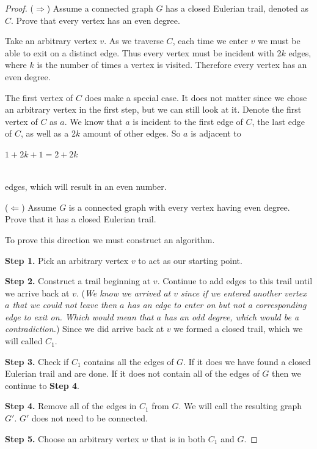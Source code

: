 \documentclass[10pt]{amsart}
\begin{document}
\begin{proof} 
    ($\Rightarrow$) Assume a connected graph $G$ has a closed Eulerian trail, denoted as $C$. Prove that
    every vertex has an even degree. 
    
    \noindent
    Take an arbitrary vertex $v$. As we traverse $C$, each time we enter $v$ we must be able to exit on a
    distinct edge. Thus every vertex must be incident with 2$k$ edges, where $k$ is the number of times
    a vertex is visited. Therefore every vertex has an even degree. 

    \noindent
    The first vertex of $C$ does make a special case. It does not matter since we chose an arbitrary
    vertex in the first step, but we can still look at it. Denote the first vertex of $C$ as $a$. We
    know that $a$ is incident to the first edge of $C$, the last edge of $C$, as well as a 2$k$ amount
    of other edges. So $a$ is adjacent to \\
    \centerline{$1+2k+1 = 2+2k$} \\
    edges, which will result in an even number.

    \noindent
    ($\Leftarrow$) Assume $G$ is a connected graph with every vertex having even degree. Prove that
    it has a closed Eulerian trail.

    \noindent
    To prove this direction we must construct an algorithm. 
    
    \noindent
    \textbf{Step 1.} Pick an arbitrary vertex $v$ to act as our starting point.

    \noindent
    \textbf{Step 2.} Construct a trail beginning at $v$. Continue to add edges to this trail until we
    arrive back at $v$. (\emph{We know we arrived at $v$ since if we entered another vertex $a$ that we
    could not leave then $a$ has an edge to enter on but not a corresponding edge to exit on. Which would
    mean that $a$ has an odd degree, which would be a contradiction.}) Since we did arrive back at
    $v$ we formed a closed trail, which we will called $C_1$.

    \noindent
    \textbf{Step 3.} Check if $C_1$ contains all the edges of $G$. If it does we have found a closed
    Eulerian trail and are done. If it does not contain all of the edges of $G$ then we continue to
    \textbf{Step 4}.

    \noindent
    \textbf{Step 4.} Remove all of the edges in $C_1$ from $G$. We will call the resulting graph $G'$.
    $G'$ does not need to be connected.

    \noindent
    \textbf{Step 5.} Choose an arbitrary vertex $w$ that is in both $C_1$ and $G$.


\end{proof}
\end{document}
